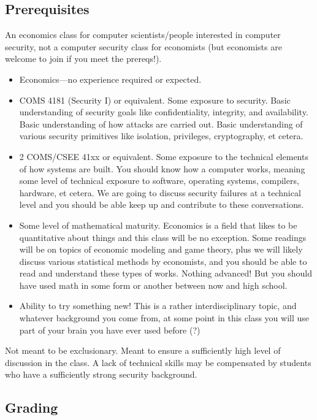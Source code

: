 \documentclass[11pt]{article}
\begin{document}
\subsection{Prerequisites}

An economics class for computer scientists/people interested in computer security, not a computer security class for economists
(but economists are welcome to join if you meet the prereqs!).

\begin{itemize}
    \item Economics---no experience required or expected.
    \item COMS 4181 (Security I) or equivalent. Some exposure to security. Basic understanding of security goals like confidentiality, integrity, and availability. Basic understanding of how attacks are carried out. Basic understanding of various security primitives like isolation, privileges, cryptography, et cetera. 
    \item 2 COMS/CSEE 41xx or equivalent. Some exposure to the technical elements of how systems are built. You should know how a computer works, meaning some level of technical exposure to software, operating systems, compilers, hardware, et cetera. We are going to discuss security failures at a technical level and you should be able keep up and contribute to these conversations.
    \item Some level of mathematical maturity. Economics is a field that likes to be quantitative about things and this class will be no exception. Some readings will be on topics of economic modeling and game theory, plus we will likely discuss various statistical methods by economists, and you should be able to read and understand these types of works. Nothing advanced! But you should have used math in some form or another between now and high school. 
    \item Ability to try something new! This is a rather interdisciplinary topic, and whatever background you come from, at some point in this class you will use part of your brain you have ever used before (?)
\end{itemize}

Not meant to be exclusionary. Meant to ensure a sufficiently high level of discussion in the class. 
A lack of technical skills may be compensated by students who have a sufficiently strong security background.


\subsection{Grading}
\end{document}
